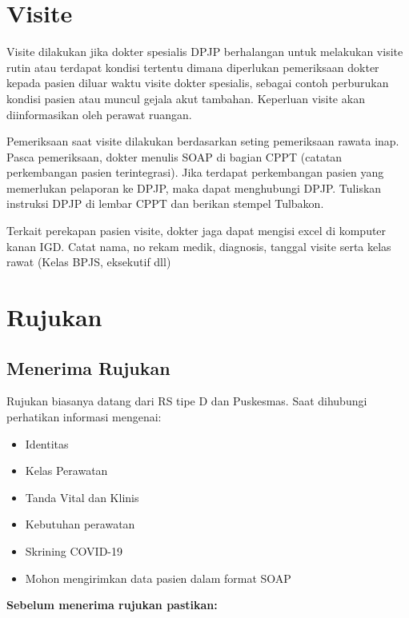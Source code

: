 \documentclass[
]{book}
\providecommand{\tightlist}{%
  \setlength{\itemsep}{0pt}\setlength{\parskip}{0pt}}
\begin{document}
\hypertarget{visite}{%
\section{Visite}\label{visite}}

Visite dilakukan jika dokter spesialis DPJP berhalangan untuk melakukan visite rutin atau terdapat kondisi tertentu dimana diperlukan pemeriksaan dokter kepada pasien diluar waktu visite dokter spesialis, sebagai contoh perburukan kondisi pasien atau muncul gejala akut tambahan. Keperluan visite akan diinformasikan oleh perawat ruangan.

Pemeriksaan saat visite dilakukan berdasarkan seting pemeriksaan rawata inap. Pasca pemeriksaan, dokter menulis SOAP di bagian CPPT (catatan perkembangan pasien terintegrasi). Jika terdapat perkembangan pasien yang memerlukan pelaporan ke DPJP, maka dapat menghubungi DPJP. Tuliskan instruksi DPJP di lembar CPPT dan berikan stempel Tulbakon.

Terkait perekapan pasien visite, dokter jaga dapat mengisi excel di komputer kanan IGD. Catat nama, no rekam medik, diagnosis, tanggal visite serta kelas rawat (Kelas BPJS, eksekutif dll)

\hypertarget{rujukan}{%
\section{Rujukan}\label{rujukan}}

\hypertarget{menerima-rujukan}{%
\subsection{Menerima Rujukan}\label{menerima-rujukan}}

Rujukan biasanya datang dari RS tipe D dan Puskesmas. Saat dihubungi perhatikan informasi mengenai:

\begin{itemize}
\tightlist
\item
  Identitas
\item
  Kelas Perawatan
\item
  Tanda Vital dan Klinis
\item
  Kebutuhan perawatan
\item
  Skrining COVID-19
\item
  Mohon mengirimkan data pasien dalam format SOAP
\end{itemize}

\textbf{Sebelum menerima rujukan pastikan:}
\end{document}
